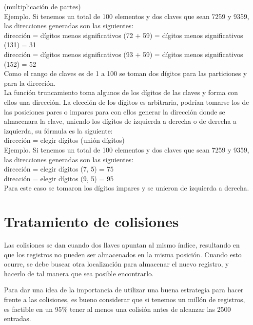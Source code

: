 \documentclass[letterpaper,openright,12pt]{report}
\begin{document}
(multiplicación de partes)\\[0.4cm] Ejemplo. Si tenemos un total de 100
elementos y dos claves que sean 7259 y 9359, las direcciones generadas
son las siguientes:\\ dirección = dígitos menos significativos (72 + 59)
= dígitos menos significativos (131) = 31\\ dirección = dígitos menos
significativos (93 + 59) = dígitos menos significativos (152) = 52\\[0.4cm]
Como el rango de claves es de 1 a 100 se toman dos dígitos para las
particiones y para la dirección.\\ La función truncamiento toma algunos
de los dígitos de las claves y forma con ellos una dirección. La
elección de los dígitos es arbitraria, podrían tomarse los de las
posiciones pares o impares para con ellos generar la dirección donde se
almacenara la clave, uniendo los dígitos de izquierda a derecha o de
derecha a izquierda, su fórmula es la siguiente:\\[0.4cm] dirección = elegir
dígitos (unión dígitos)\\ Ejemplo. Si tenemos un total de 100 elementos
y dos claves que sean 7259 y 9359, las direcciones generadas son las
siguientes:\\ dirección = elegir dígitos (7, 5) = 75\\ dirección =
elegir dígitos (9, 5) = 95\\[0.4cm] Para este caso se tomaron los dígitos
impares y se unieron de izquierda a derecha.
\newpage

\section{Tratamiento de colisiones}
Las colisiones se dan cuando dos llaves apuntan al mismo índice, resultando en que los registros no pueden ser almacenados en la misma posición. Cuando esto ocurre, se debe buscar otra localización para almacenar el nuevo registro, y hacerlo de tal manera que sea posible encontrarlo.

Para dar una idea de la importancia de utilizar una buena estrategia para hacer frente a las colisiones, es bueno considerar que si tenemos un millón de registros, es factible en un 95\% tener al menos una colisión antes de alcanzar las 2500 entradas.
\end{document}
